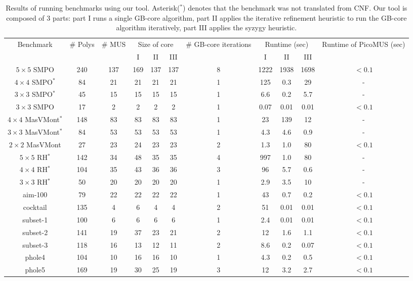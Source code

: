 \begin{table}[tbp]
\centering
\caption{Results of running benchmarks using our tool. 
Asterisk($^*$) denotes that the benchmark was not translated from CNF.
Our tool is composed of 3 parts: part I runs a single GB-core algorithm,
part II applies the iterative refinement heuristic to run the GB-core algorithm
iteratively, part III applies the syzygy heuristic.}
{\small 
\begin{tabular}{|c||c|c|c|c|c|c|c|c|c|c|}
\hline
\multirow{3}{1.8cm}{\centering Benchmark} 
& \multirow{3}{0.7cm}{\centering \# Polys} 
& \multirow{3}{0.7cm}{\centering \# MUS} 
& \multicolumn{3}{c|}{\multirow{2}{1.5cm}{\centering Size of core}}
 & \multirow{3}{1.3cm}{\centering \# GB-core iterations}
 & \multicolumn{3}{c|}{\multirow{2}{1.8cm}{\centering Runtime (sec)}}
 & \multirow{3}{1.6cm}{\centering Runtime of PicoMUS (sec)} \\
  & & &\multicolumn{3}{c|}{}& &\multicolumn{3}{c|}{}& \\
  \cline{4-6} \cline{8-10}
    & & & I & II & III & & I & II & III & \\
\hline
\hline
$5\times 5$ SMPO & 240  & 137  & 169 & 137 & 137  & 8  & 1222 & 1938 & 1698 & $<0.1$\\
$4\times 4$ SMPO$^*$ & 84  & 21  & 21 & 21 & 21 & 1  & 125 & 0.3 & 29  & - \\
$3\times 3$ SMPO$^*$ & 45  & 15  & 15 & 15 & 15  & 1  & 6.6 & 0.2 & 5.7 & - \\
$3 \times 3$ SMPO & 17 & 2 & 2 &2 & 2 & 1 & 0.07 & 0.01 & 0.01  & $<0.1$  \\
$4 \times 4$ MasVMont$^*$ & 148 & 83 & 83 & 83 & 83 & 1 & 23 & 139 & 12 & - \\
$3 \times 3$ MasVMont$^*$ & 84 & 53 & 53 & 53 & 53  & 1 & 4.3 & 4.6 & 0.9  & - \\
$2 \times 2$ MasVMont & 27 & 23 & 24 & 23 & 23 & 2 & 1.3 & 1.0 & 80  & $<0.1$ \\
$5\times 5$ RH$^*$ & 142  & 34  & 48 & 35 & 35  & 4  & 997 & 1.0 & 80 & - \\
$4\times 4$ RH$^*$ & 104  & 35  & 43 & 36 & 36  & 3  & 96 & 5.7 & 0.6 & -\\
$3\times 3$ RH$^*$ & 50  & 20  & 20 & 20 & 20  & 1  &2.9 & 3.5 & 10  & -\\
aim-100 & 79 & 22 & 22 & 22 & 22 & 1  & 43 & 0.7 & 0.2 & $<0.1$\\
cocktail & 135 & 4 & 6 & 4 & 4 & 2 & 51 & 0.01 & 0.01  & $<0.1$ \\
subset-1 & 100 & 6 & 6 & 6 & 6 & 1 & 2.4 & 0.01 & 0.01 & $<0.1$ \\
subset-2 & 141 & 19 & 37 & 23 & 21 & 2 & 12 & 1.6 & 1.1 & $<0.1$  \\
subset-3 & 118 & 16 & 13 & 12 & 11 & 2 & 8.6 & 0.2 & 0.07 & $<0.1$ \\
phole4 & 104 & 10 & 16 & 16 & 10 & 1 & 4.3 & 0.2 & 0.5 &  $<0.1$\\
phole5 & 169 & 19 & 30 & 25 & 19 & 3 & 12 & 3.2 & 2.7 & $<0.1$ \\
\hline
\end{tabular}
}
\label{tab:result}  
\end{table} 

